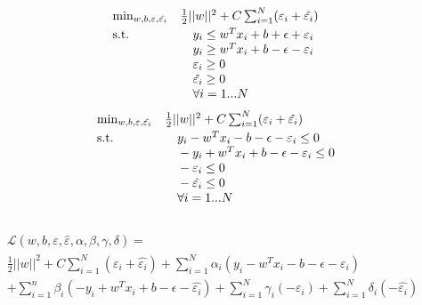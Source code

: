 \[
  \begin{array}{ll@{}r@{}l}
    	\min_{w, b, \varepsilon, \hat{\varepsilon_i}} & \frac{1}{2}||w||^{2} + C\sum_{i = 1}^{N}(\varepsilon_i + \hat{\varepsilon_i})\\[\jot]
    	\text{s.t.}& \phantom{15}y_i \leq w^{T}x_i + b + \epsilon + \varepsilon_i \\
    	&   \phantom{15}y_i \geq w^{T}x_i + b - \epsilon - \varepsilon_i \\
	& \phantom{15}\varepsilon_i \geq 0 \\
	& \phantom{15}\hat{\varepsilon_i} \geq 0\\
	& \phantom{15} \forall i = 1...N
  \end{array}
\]
\[
  \begin{array}{ll@{}r@{}l}
    	\min_{w, b, \varepsilon, \hat{\varepsilon_i}} & \frac{1}{2}||w||^{2} + C\sum_{i = 1}^{N}(\varepsilon_i + \hat{\varepsilon_i})\\[\jot]
    	\text{s.t.}& \phantom{15}y_i - w^{T}x_i -  b - \epsilon - \varepsilon_i \leq 0\\
    	& \phantom{15} -y_i + w^{T}x_i +  b - \epsilon - \varepsilon_i \leq 0\\
	& \phantom{15} -\varepsilon_i \leq 0 \\
	& \phantom{15}-\hat{\varepsilon_i} \leq 0\\
	& \phantom{15} \forall i = 1...N
  \end{array}
\]
\\
\begin{multline*}
\mathcal{L}(w, b, \varepsilon, \hat{\varepsilon}, \alpha, \beta, \gamma, \delta) =\\
\frac{1}{2}||w||^{2}+ C\sum_{i=1}^{N}(\varepsilon_i + \hat{\varepsilon_i}) + \sum_{i = 1}^{N}\alpha_i(y_i - w^{T}x_i -  b - \epsilon - \varepsilon_i) \\
+ \sum_{i = 1}^{n}\beta_i( -y_i + w^{T}x_i +  b - \epsilon - \hat{\varepsilon_i})+ \sum_{i = 1}^{N}\gamma_i (-\varepsilon_i) + \sum_{i = 1}^{N}\delta_i(-\hat{\varepsilon_i}) 
\end{multline*}
\\
